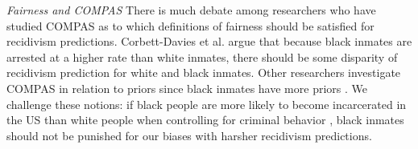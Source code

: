 \documentclass{article}
\begin{document}
\textit{Fairness and COMPAS} There is much debate among researchers who have studied COMPAS as to which definitions of fairness should be satisfied for recidivism predictions. Corbett-Davies et al.  argue that because black inmates are arrested at a higher rate than white inmates, there should be some disparity of recidivism prediction for white and black inmates. Other researchers investigate COMPAS in relation to priors since black inmates have more priors \cite{Chouldechova}. We challenge these notions: if black people are more likely to become incarcerated in the US than white people when controlling for criminal behavior \cite{Bridges}, black inmates should not be punished for our biases with harsher recidivism predictions.
\end{document}
